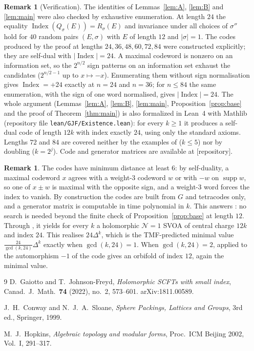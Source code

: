 \documentclass[11pt]{amsart}
\theoremstyle{definition}
\newtheorem{remark}[theorem]{Remark}
\newcommand{\supp}{\operatorname{supp}}
\newcommand{\Index}{\operatorname{Index}}
\begin{document}
\begin{remark}[Verification]
The identities of Lemmas~\ref{lem:A}, \ref{lem:B} and \ref{lem:main} were also checked by
exhaustive enumeration. At length $24$ the equality $\Index(Q_\sigma(E))=R_\sigma(E)$ and
invariance under all choices of $\sigma''$ hold for $40$ random pairs $(E,\sigma)$ with
$E$ of length $12$ and $|\sigma|=1$. The codes produced by the proof at lengths $24,36,48,60,72,84$ were
constructed explicitly; they are self-dual with $|\Index|=24$. A maximal codeword is nonzero on an
information set, so the $2^{n/2}$ sign patterns on an information set exhaust the candidates
($2^{n/2-1}$ up to $x\mapsto-x$). Enumerating them without sign normalisation gives
$\Index=+24$ exactly at $n=24$ and $n=36$; for $n\le84$ the same enumeration, with the sign of one word
normalised, gives $|\Index|=24$. The whole argument (Lemmas~\ref{lem:A}, \ref{lem:B}, \ref{lem:main}, Proposition~\ref{prop:base} and
the proof of Theorem~\ref{thm:main}) is also formalized in Lean~4 with Mathlib (repository file
\texttt{lean/GJF/Existence.lean}): for every $k\ge1$ it produces a self-dual code of length $12k$ with
index exactly $24$, using only the standard axioms. Lengths $72$ and $84$ are covered neither by the examples of
\cite{GJF} ($k\le5$) nor by doubling ($k=2^j$). Code and generator matrices are available at [repository].
\end{remark}

\begin{remark}
The codes have minimum distance at least $6$: by self-duality, a maximal codeword $x$ agrees with a
weight-$3$ codeword $w$ or with $-w$ on $\supp w$, so one of $x\pm w$ is maximal with the opposite
sign, and a weight-$3$ word forces the index to vanish. By construction the codes are built from $G$
and tetracodes only, and a generator matrix is computable in time polynomial in $k$. This answers \cite[Question~0.1]{GJF}: no search is
needed beyond the finite check of Proposition~\ref{prop:base} at length $12$. Through
\cite{GJF}, it yields for every $k$ a holomorphic $\mathcal N=1$ SVOA of central charge $12k$ and
index $24$. This realises $24\Delta^k$, which is the TMF-predicted minimal value
$\tfrac{24}{\gcd(k,24)}\Delta^k$ exactly when $\gcd(k,24)=1$. When $\gcd(k,24)=2$,
\cite[Thm.~5.6]{GJF} applied to the automorphism $-1$ of the code gives an orbifold of index $12$,
again the minimal value.
\end{remark}

\begin{thebibliography}{9}
D.~Gaiotto and T.~Johnson-Freyd,
\emph{Holomorphic SCFTs with small index},
Canad.\ J.\ Math.\ \textbf{74} (2022), no.~2, 573--601. arXiv:1811.00589.

J.~H.~Conway and N.~J.~A.~Sloane,
\emph{Sphere Packings, Lattices and Groups}, 3rd ed., Springer, 1999.

M.~J.~Hopkins,
\emph{Algebraic topology and modular forms},
Proc.\ ICM Beijing 2002, Vol.~I, 291--317.
\end{thebibliography}
\end{document}
